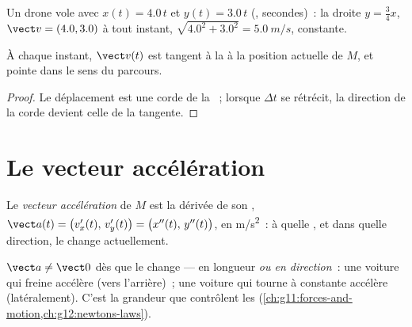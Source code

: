 \begin{example}\label{ex:g12:kinematics-2d:drone}
Un drone vole avec $x(t) = 4.0\,t$ et $y(t) = 3.0\,t$ (,
secondes)~:  la droite $y = \tfrac34 x$, 
$\vect v = (4.0, 3.0)$ à tout instant, 
$\sqrt{4.0^2 + 3.0^2} = \qty{5.0}{m/s}$, constante.
\end{example}

\begin{proposition}\label{prop:g12:kinematics-2d:tangent}
À chaque instant, $\vect v(t)$ est tangent à la
 à la position actuelle de $M$, et pointe dans
le sens du parcours.
\end{proposition}

\begin{proof}
Le déplacement est une corde de la ~; lorsque
$\Delta t$ se rétrécit, la direction de la corde devient celle de la
tangente.
\end{proof}

\section{Le vecteur accélération}

\begin{definition}\label{def:g12:kinematics-2d:acceleration}
Le \emph{vecteur accélération} de $M$ est
la dérivée de son ,
$\vect a(t) = \bigl(v_x'(t),\, v_y'(t)\bigr) =
\bigl(x''(t),\, y''(t)\bigr)$, en \unit{m/s^2}~: à quelle , et
dans quelle direction, le  change actuellement.
\end{definition}

\begin{remark}\label{rem:g12:kinematics-2d:turning}
$\vect a \neq \vect 0$ dès que le  change --- en
longueur \emph{ou en direction}~: une voiture qui freine accélère
(vers l'arrière)~; une voiture qui tourne à  constante
accélère (latéralement). C'est la grandeur que contrôlent les
(\cref{ch:g11:forces-and-motion,ch:g12:newtons-laws}).
\end{remark}

